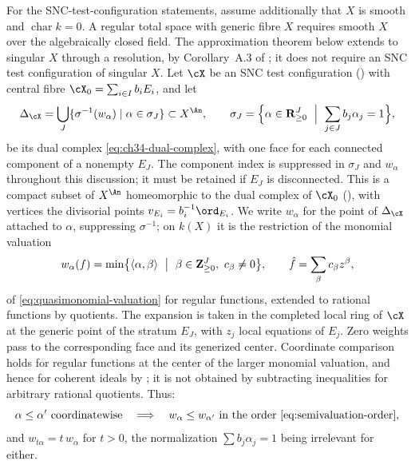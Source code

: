For the SNC-test-configuration statements, assume additionally that
$X$ is smooth and $\operatorname{char}k=0$.
A regular total space with generic fibre $X$ requires smooth $X$ over
the algebraically closed field.  The approximation theorem below
extends to singular $X$ through a resolution, by Corollary~A.3 of
\cite{BJ22}; it does not require an SNC test configuration of singular $X$.
Let $\cX$ be an SNC test configuration
() with central fibre $\cX_0=\sum_{i\in I}b_iE_i$,
and let
\[
 \Delta_{\cX}=\bigcup_J\{\sigma^{-1}(w_\alpha)\mid\alpha\in\sigma_J\}
 \subset X^{\An},
 \qquad
 \sigma_J=\Bigl\{\alpha\in\mathbf R^J_{\ge0}\ \Bigm|\
 \sum_{j\in J}b_j\alpha_j=1\Bigr\},
\]
be its dual complex \eqref{eq:ch34-dual-complex}, with one face
for each connected component of a nonempty $E_J$.  The component
index is suppressed in $\sigma_J$ and $w_\alpha$ throughout this
discussion; it must be retained if $E_J$ is disconnected.
This is a compact subset of
$X^{\An}$ homeomorphic to the dual complex of $\cX_0$
(), with vertices the divisorial points
$v_{E_i}=b_i^{-1}\ord_{E_i}$.  We write $w_\alpha$ for the point of
$\Delta_\cX$ attached to $\alpha$, suppressing $\sigma^{-1}$; on
$k(X)$ it is the restriction of the monomial valuation
\[
 w_\alpha(f)=\min\bigl\{\langle\alpha,\beta\rangle
 \ \bigm|\ \beta\in\mathbf Z^J_{\ge0},\ c_\beta\ne0\bigr\},
 \qquad
 \hat f=\sum_\beta c_\beta z^\beta,
\]
of \eqref{eq:quasimonomial-valuation} for regular functions, extended
to rational functions by quotients.  The expansion is taken in the
completed local ring of $\cX$ at the generic point of the stratum
$E_J$, with $z_j$ local equations of $E_j$.  Zero weights pass to
the corresponding face and its generized center.  Coordinate comparison
holds for regular functions at the center of the larger monomial
valuation, and hence for coherent ideals by
; it is not obtained by subtracting
inequalities for arbitrary rational quotients.  Thus:
\begin{equation*}
 \alpha\le\alpha'\ \text{coordinatewise}
 \quad\Longrightarrow\quad
 w_\alpha\le w_{\alpha'}
 \ \text{in the order }\eqref{eq:semivaluation-order},
\end{equation*}
and $w_{t\alpha}=t\,w_\alpha$ for $t>0$, the normalization
$\sum b_j\alpha_j=1$ being irrelevant for either.

